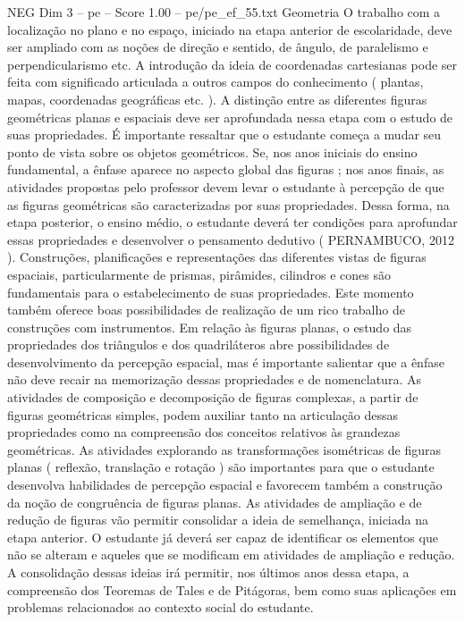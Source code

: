 \begin{textsample}{NEG Dim 3 – pe – Score 1.00 – pe/pe\_ef\_55.txt}  \label{ex:f3_neg_012}
Geometria O trabalho com a localização no plano e no espaço, iniciado na etapa anterior de escolaridade, deve ser ampliado com as noções de direção e sentido, de ângulo, de paralelismo e perpendicularismo etc.
A introdução da ideia de coordenadas cartesianas pode ser feita com significado articulada a outros campos do conhecimento ( plantas, mapas, coordenadas geográficas etc. ).
A distinção entre as diferentes figuras geométricas planas e espaciais deve ser aprofundada nessa etapa com o estudo de suas propriedades.
É importante ressaltar que o estudante começa a mudar seu ponto de vista sobre os objetos geométricos.
Se, nos anos iniciais do ensino fundamental, a ênfase aparece no aspecto global das figuras ; nos anos finais, as atividades propostas pelo professor devem levar o estudante à percepção de que as figuras geométricas são caracterizadas por suas propriedades.
Dessa forma, na etapa posterior, o ensino médio, o estudante deverá ter condições para aprofundar essas propriedades e desenvolver o pensamento dedutivo ( PERNAMBUCO, 2012 ).
Construções, planificações e representações das diferentes vistas de figuras espaciais, particularmente de prismas, pirâmides, cilindros e cones são fundamentais para o estabelecimento de suas propriedades.
Este momento também oferece boas possibilidades de realização de um rico trabalho de construções com instrumentos.
Em relação às figuras planas, o estudo das propriedades dos triângulos e dos quadriláteros abre possibilidades de desenvolvimento da percepção espacial, mas é importante salientar que a ênfase não deve recair na memorização dessas propriedades e de nomenclatura.
As atividades de composição e decomposição de figuras complexas, a partir de figuras geométricas simples, podem auxiliar tanto na articulação dessas propriedades como na compreensão dos conceitos relativos às grandezas geométricas.
As atividades explorando as transformações isométricas de figuras planas ( reflexão, translação e rotação ) são importantes para que o estudante desenvolva habilidades de percepção espacial e favorecem também a construção da noção de congruência de figuras planas.
As atividades de ampliação e de redução de figuras vão permitir consolidar a ideia de semelhança, iniciada na etapa anterior.
O estudante já deverá ser capaz de identificar os elementos que não se alteram e aqueles que se modificam em atividades de ampliação e redução.
A consolidação dessas ideias irá permitir, nos últimos anos dessa etapa, a compreensão dos Teoremas de Tales e de Pitágoras, bem como suas aplicações em problemas relacionados ao contexto social do estudante.

\end{textsample}
